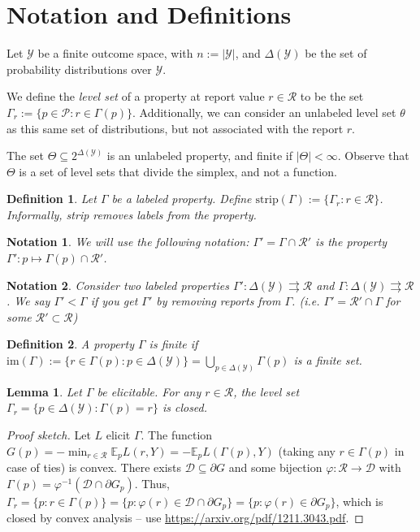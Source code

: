 \documentclass[12pt]{article}
\newcommand{\Comments}{1}
\newcommand{\mynote}[2]{\ifnum\Comments=1\textcolor{#1}{#2}\fi}
\newcommand{\jessie}[1]{\mynote{purple}{[JF: #1]}}
\newcommand{\D}{\mathcal{D}}
\newcommand{\E}{\mathbb{E}}
\renewcommand{\P}{\mathcal{P}}
\newcommand{\R}{\mathcal{R}}
\newcommand{\Y}{\mathcal{Y}}
\newcommand{\toto}{\rightrightarrows}
\newcommand{\im}{\text{im}}
\newtheorem{lemma}{Lemma}
\newtheorem{definition}{Definition}
\newtheorem{notation}{Notation}
\begin{document}
\section{Notation and Definitions}

Let $\Y$ be a finite outcome space, with $n:=|\Y|$, and $\Delta(\Y)$ be the set of probability distributions over $\Y$.

We define the \emph{level set} of a property at report value $r\in\R$ to be the set $\Gamma_r := \{p\in\P : r \in \Gamma(p)\}$.
Additionally, we can consider an unlabeled level set $\theta$ as this same set of distributions, but not associated with the report $r$.

The set $\Theta \subseteq 2^{\Delta(\Y)}$ is an unlabeled property, and finite if $|\Theta| < \infty$.
Observe that $\Theta$ is a set of level sets that divide the simplex, and not a function.

\begin{definition}
Let $\Gamma$ be a labeled property.
Define $\text{strip}(\Gamma) := \{ \Gamma_r : r \in \R \}$.
Informally, strip removes labels from the property.
\end{definition}

\begin{notation}
We will use the following notation: $\Gamma' = \Gamma \cap \R'$ is the property $\Gamma' : p \mapsto \Gamma(p) \cap \R'$.  
\end{notation}


\begin{notation}
  Consider two labeled properties $\Gamma' : \Delta(\Y) \toto \R$ and $\Gamma : \Delta(\Y) \toto \R$.
  We say $\Gamma' < \Gamma$ if you get $\Gamma'$ by removing reports from $\Gamma$.
  (i.e. $\Gamma' = \R' \cap \Gamma$ for some $\R' \subset \R$)
\end{notation}

\begin{definition}
A property $\Gamma$ is \emph{finite} if $\im(\Gamma) := \{r\in\Gamma(p) : p\in\Delta(\Y)\} = \bigcup_{p\in\Delta(\Y)} \Gamma(p)$ is a finite set.
\end{definition}

\begin{lemma}\label{conj:closed-level-sets}
  Let $\Gamma$ be elicitable.
  For any $r\in\R$, the level set $\Gamma_r = \{ p \in \Delta(\Y) : \Gamma(p) = r \}$ is closed.
\end{lemma}
\begin{proof}[Proof sketch]
  Let $L$ elicit $\Gamma$.
  The function $G(p) = -\min_{r\in\R} \E_p L(r,Y) = -\E_p L(\Gamma(p),Y)$ (taking any $r\in\Gamma(p)$ in case of ties) is convex.
  There exists $\D \subseteq \partial G$ and some bijection $\varphi : \R \to \D$ with $\Gamma(p) = \varphi^{-1}(\D\cap \partial G_p)$.
  Thus, $\Gamma_r = \{p : r\in\Gamma(p)\} = \{p : \varphi(r) \in \D\cap\partial G_p\} = \{p : \varphi(r) \in \partial G_p\}$, which is closed by convex analysis -- use \url{https://arxiv.org/pdf/1211.3043.pdf}.
\end{proof}
\end{document}
